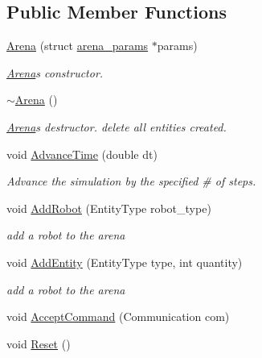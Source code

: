 \subsection*{Public Member Functions}
\begin{DoxyCompactItemize}
\item 
\hyperlink{classArena_af9dd53a494cf07b9183d0cc87ff929b7}{Arena} (struct \hyperlink{structarena__params}{arena\+\_\+params} $\ast$params)
\begin{DoxyCompactList}\small\item\em \hyperlink{classArena}{Arena}\textquotesingle{}s constructor. \end{DoxyCompactList}\item 
\hyperlink{classArena_ae21b399e9e3f6b8ac4ecc44d7d1667fc}{$\sim$\+Arena} ()\hypertarget{classArena_ae21b399e9e3f6b8ac4ecc44d7d1667fc}{}\label{classArena_ae21b399e9e3f6b8ac4ecc44d7d1667fc}

\begin{DoxyCompactList}\small\item\em \hyperlink{classArena}{Arena}\textquotesingle{}s destructor. {\ttfamily delete} all entities created. \end{DoxyCompactList}\item 
void \hyperlink{classArena_ad92d8b2e1593b652445e31d173977fc6}{Advance\+Time} (double dt)
\begin{DoxyCompactList}\small\item\em Advance the simulation by the specified \# of steps. \end{DoxyCompactList}\item 
void \hyperlink{classArena_a16f66fafd9580a26c86536b46ad2c202}{Add\+Robot} (Entity\+Type robot\+\_\+type)
\begin{DoxyCompactList}\small\item\em add a robot to the arena \end{DoxyCompactList}\item 
void \hyperlink{classArena_a9e00ef1a079d49d648359952fcfaa9f3}{Add\+Entity} (Entity\+Type type, int quantity)
\begin{DoxyCompactList}\small\item\em add a robot to the arena \end{DoxyCompactList}\item 
void \hyperlink{classArena_a16fac8e4b2399fcf0db01a9722069c33}{Accept\+Command} (Communication com)
\item 
void \hyperlink{classArena_a95e295d03a14385f4402a8e839fbae9b}{Reset} ()\hypertarget{classArena_a95e295d03a14385f4402a8e839fbae9b}{}\label{classArena_a95e295d03a14385f4402a8e839fbae9b}


\end{DoxyCompactItemize}
